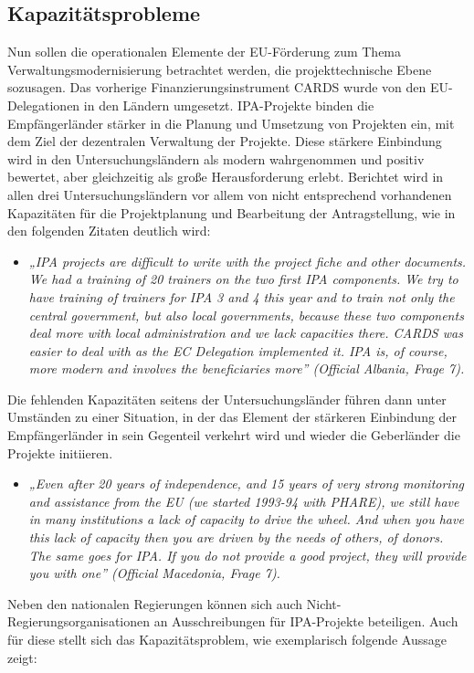 \subsection{Kapazitätsprobleme}
Nun sollen die operationalen Elemente der EU-Förderung zum Thema Verwaltungsmodernisierung betrachtet werden, die projekttechnische Ebene sozusagen. Das vorherige Finanzierungsinstrument CARDS wurde von den EU-Delegationen in den Ländern umgesetzt. IPA-Projekte binden die Empfängerländer stärker in die Planung und Umsetzung von Projekten ein, mit dem Ziel der dezentralen Verwaltung der Projekte. Diese stärkere Einbindung wird in den Untersuchungsländern als modern wahrgenommen und positiv bewertet, aber gleichzeitig als große Herausforderung erlebt. Berichtet wird in allen drei Untersuchungsländern vor allem von nicht entsprechend vorhandenen Kapazitäten für die Projektplanung und Bearbeitung der Antragstellung, wie in den folgenden Zitaten deutlich wird:
\begin{itemize}[label={}]
\item \textit{„IPA projects are difficult to write with the project fiche and other documents. We had a training of 20 trainers on the two first IPA components. We try to have training of trainers for IPA 3 and 4 this year and to train not only the central government, but also local governments, because these two components deal more with local administration and we lack capacities there. CARDS was easier to deal with as the EC Delegation implemented it. IPA is, of course, more modern and involves the beneficiaries more” (Official Albania, Frage 7).}
\end{itemize}
Die fehlenden Kapazitäten seitens der Untersuchungsländer führen dann unter Umständen zu einer Situation, in der das Element der stärkeren Einbindung der Empfängerländer in sein Gegenteil verkehrt wird und wieder die Geberländer die Projekte initiieren.
\begin{itemize}[label={}]
\item \textit{„Even after 20 years of independence, and 15 years of very strong monitoring and assistance from the EU (we started 1993-94 with PHARE), we still have in many institutions a lack of capacity to drive the wheel. And when you have this lack of capacity then you are driven by the needs of others, of donors. The same goes for IPA. If you do not provide a good project, they will provide you with one” (Official Macedonia, Frage 7).}
\end{itemize}
Neben den nationalen Regierungen können sich auch Nicht-Regierungsorganisationen an Ausschreibungen für IPA-Projekte beteiligen. Auch für diese stellt sich das Kapazitätsproblem, wie exemplarisch folgende Aussage zeigt:
